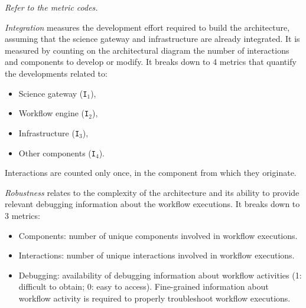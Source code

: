 \documentclass[preprint,3p,twocolumn]{elsarticle}
\newcommand{\todo}[1]{\color{blue}\xspace\emph{#1}\xspace\color{black}}
\begin{document}
\todo{Refer to the metric codes.}

\emph{Integration} measures the development effort required to build
the architecture, assuming that the science gateway and infrastructure
are already integrated. It is measured by counting on the
architectural diagram the number of interactions and components to
develop or modify. It breaks down to 4 metrics that quantify the
developments related to:
\begin{itemize}[itemsep=0cm]
\item Science gateway (\texttt{I$_1$}),
\item Workflow engine (\texttt{I$_2$}),
\item Infrastructure (\texttt{I$_3$}),
\item Other components (\texttt{I$_4$}).
\end{itemize}
Interactions are counted only once, in the component from which they
originate.


\emph{Robustness} relates to the complexity of the architecture and
its ability to provide relevant debugging information about the
workflow executions. It breaks down to 3 metrics:
\begin{itemize}[itemsep=0cm]
\item Components: number of unique components involved in workflow executions.
\item Interactions: number of unique interactions involved in workflow executions. 
\item Debugging: availability of debugging information about workflow
  activities (1: difficult to obtain; 0: easy to access). Fine-grained
  information about workflow activity is required to properly
  troubleshoot workflow executions.
\end{itemize}
\end{document}
